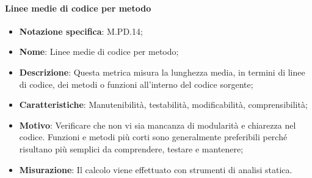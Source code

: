 \paragraph*{Linee medie di codice per metodo}
\begin{itemize}
    \item \textbf{Notazione specifica}: M.PD.14;
    \item \textbf{Nome}: Linee medie di codice per metodo;
    \item \textbf{Descrizione}: Questa metrica misura la lunghezza media, in termini di linee di codice, dei metodi o funzioni all'interno del codice sorgente;
    \item \textbf{Caratteristiche}: Manutenibilità, testabilità, modificabilità, comprensibilità;
    \item \textbf{Motivo}: Verificare che non vi sia mancanza di modularità e chiarezza nel codice. Funzioni e metodi più corti sono generalmente preferibili perché risultano più semplici da comprendere, testare e mantenere; 
    \item \textbf{Misurazione}: Il calcolo viene effettuato con strumenti di analisi statica.
\end{itemize}
